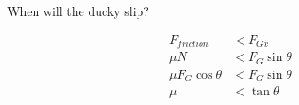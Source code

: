 When will the ducky slip?

\begin{solution}
\begin{align*}
    F_{friction} &< F_{G\hat{x}} \\
    \mu N &< F_G\sin\theta \\
    \mu F_G\cos\theta &< F_G\sin\theta \\
    \mu &< \tan\theta
\end{align*}
\end{solution}
